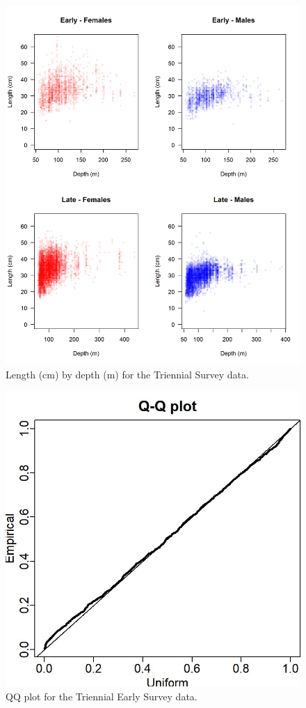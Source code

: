 \documentclass[12pt,]{article}
\begin{document}
\begin{figure}
\centering
\includegraphics{Figures/Tri_Size_by_Depth.png}
\caption{Length (cm) by depth (m) for the Triennial Survey data.
\label{fig:tri_size_depth}}
\end{figure}

\FloatBarrier

\begin{figure}
\centering
\includegraphics{Figures/tri_early_Posterior_Predictive-Histogram-1.jpg}
\caption{QQ plot for the Triennial Early Survey data.
\label{fig:tri_early_qq}}
\end{figure}
\end{document}
